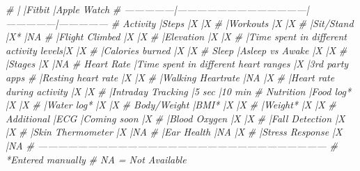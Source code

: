 \documentclass[]{book}
\newenvironment{Shaded}{\begin{snugshade}}{\end{snugshade}}
\newcommand{\CommentTok}[1]{\textcolor[rgb]{0.56,0.35,0.01}{\textit{#1}}}
\begin{document}
\begin{Shaded}
\begin{Highlighting}[]
\CommentTok{#                |                                       |Fitbit         |Apple Watch}
\CommentTok{# ---------------|---------------------------------------|---------------|---------------}
\CommentTok{# Activity       |Steps                                  |X              |X}
\CommentTok{#                |Workouts                               |X              |X}
\CommentTok{#                |Sit/Stand                              |X*             |NA}
\CommentTok{#                |Flight Climbed                         |X              |X}
\CommentTok{#                |Elevation                              |X              |X}
\CommentTok{#                |Time spent in different activity levels|X              |X}
\CommentTok{#                |Calories burned                        |X              |X}
\CommentTok{# Sleep          |Asleep vs Awake                        |X              |X}
\CommentTok{#                |Stages                                 |X              |NA}
\CommentTok{# Heart Rate     |Time spent in different heart ranges   |X              |3rd party apps}
\CommentTok{#                |Resting heart rate                     |X              |X}
\CommentTok{#                |Walking Heartrate                      |NA             |X}
\CommentTok{#                |Heart rate during activity             |X              |X}
\CommentTok{#                |Intraday Tracking                      |5 sec          |10 min}
\CommentTok{# Nutrition      |Food log*                              |X              |X}
\CommentTok{#                |Water log*                             |X              |X}
\CommentTok{# Body/Weight    |BMI*                                   |X              |X}
\CommentTok{#                |Weight*                                |X              |X}
\CommentTok{# Additional     |ECG                                    |Coming soon    |X}
\CommentTok{#                |Blood Oxygen                           |X              |X}
\CommentTok{#                |Fall Detection                         |X              |X}
\CommentTok{#                |Skin Thermometer                       |X              |NA}
\CommentTok{#                |Ear Health                             |NA             |X}
\CommentTok{#                |Stress Response                        |X              |NA}
\CommentTok{# ---------------------------------------------------------------------------------------}
\CommentTok{#    *Entered manually}
\CommentTok{#    NA = Not Available}
\end{Highlighting}
\end{Shaded}
\end{document}

